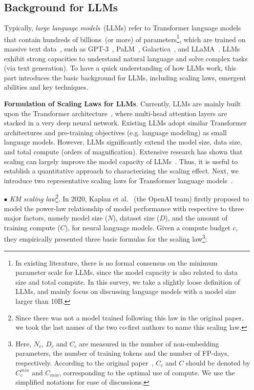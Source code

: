 \subsection{Background for LLMs}\label{sec-background}

Typically, \emph{large language models}~(LLMs) refer to Transformer language models that contain hundreds of billions~(or more) of parameters\footnote{In existing literature, there is no formal consensus on the minimum parameter scale for LLMs, since the model capacity is also related to  data size and total compute. In this survey, we take a slightly loose definition of LLMs, and mainly focus on discussing language models  with a model size larger than 10B. }, which are trained on massive text  data~\cite{Shanahan-arxiv-2022-Talking}, such as GPT-3~\cite{Brown-NeurIPS-2020-Language}, PaLM~\cite{Chowdhery-arxiv-2022-PaLM},  Galactica~\cite{Taylor-arxiv-2022-Galactica}, and LLaMA~\cite{Touvron-arxiv-2023-LLaMA}.  LLMs exhibit strong capacities to understand natural language and solve complex tasks (via text generation). To have a quick understanding of how LLMs work, this part introduces the basic background for LLMs, including scaling laws, emergent abilities and key techniques.   

\textbf{Formulation of Scaling Laws for LLMs}. Currently, LLMs are mainly built upon the Transformer architecture~\cite{Vaswani-NIPS-2017-Attention}, where  multi-head attention layers are stacked in a very deep neural network. Existing LLMs  adopt   similar Transformer architectures and pre-training objectives (e.g. language modeling) as  small language models. However, LLMs significantly extend the model size, data size, and total compute (orders of magnification). Extensive research has shown that scaling can largely improve the model capacity of LLMs~\cite{radford-blog-2019-language,Brown-NeurIPS-2020-Language,Chowdhery-arxiv-2022-PaLM}. Thus, it is useful to establish a quantitative approach to characterizing the scaling effect. Next, we introduce two representative scaling laws for Transformer language models~\cite{Kaplan-arxiv-2020-Scaling,Hoffmann-arxiv-2022-Training}.

$\bullet$ \emph{KM scaling law}\footnote{Since there was not a model trained following this law in the original paper, we took the last names of the two co-first authors to name this scaling law. }. In 2020, Kaplan et al.~\cite{Kaplan-arxiv-2020-Scaling} (the OpenAI team) firstly proposed to model the power-law relationship of model performance with respective to three major factors, namely model size ($N$), dataset size ($D$), and the amount of training compute ($C$), for neural language models. Given a compute budget $c$, they empirically presented three basic formulas for the scaling law\footnote{Here, $N_c$, $D_c$ and $C_c$ are measured in the number of non-embedding parameters, the number of training tokens and the number of FP-days, respectively. According to the original paper~\cite{Kaplan-arxiv-2020-Scaling}, $C_c$ and $C$ should be denoted by $C_c^{min}$ and $C_{min}$, corresponding to the optimal use of compute. We use the simplified notations for ease of discussions. }:

